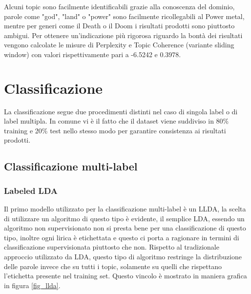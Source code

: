 \documentclass[technote]{IEEEtran}
\begin{document}
Alcuni topic sono facilmente identificabili grazie alla conoscenza del dominio, parole come "god", "land" o "power" sono facilmente ricollegabili al Power metal, mentre per generi come il Death o il Doom i risultati prodotti sono piuttosto ambigui. Per ottenere un'indicazione più rigorosa riguardo la bontà dei risultati vengono calcolate le misure di Perplexity e Topic Coherence (variante sliding window) con valori rispettivamente pari a -6.5242 e 0.3978.
\section{Classificazione}
La classificazione segue due procedimenti distinti nel caso di singola label o di label multipla. In comune vi è il fatto che il dataset viene suddiviso in 80\% training e 20\% test nello stesso modo per garantire consistenza ai risultati prodotti.
\subsection{Classificazione multi-label}
\subsubsection{Labeled LDA}
Il primo modello utilizzato per la classificazione multi-label è un LLDA, la scelta di utilizzare un algoritmo di questo tipo è evidente, il semplice LDA, essendo un algoritmo non supervisionato non si presta bene per una classificazione di questo tipo, inoltre ogni lirica è etichettata e questo ci porta a ragionare in termini di classificazione supervisionata piuttosto che non. Rispetto al tradizionale approccio utilizzato da LDA, questo tipo di algoritmo restringe la distribuzione delle parole invece che su tutti i topic, solamente su quelli che rispettano l'etichetta presente nel training set. Questo vincolo è mostrato in maniera grafica in figura \ref{fig_llda}.
\end{document}
